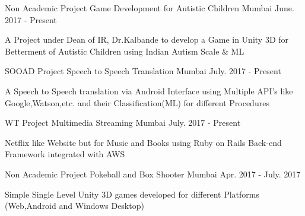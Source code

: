 

\begin{cventries}

  \cventry
    {Non Academic Project} %
    {Game Development for Autistic Children} %
    {Mumbai} %
    {June. 2017 - Present} %
    {
      \begin{cvitems} %
        \item {A Project under Dean of IR, Dr.Kalbande to develop a Game in Unity 3D for Betterment of Autistic Children using Indian Autism Scale \& ML}
      \end{cvitems}
    }

  \cventry
    {SOOAD Project} %
    {Speech to Speech Translation} %
    {Mumbai} %
    {July. 2017 - Present} %
    {
      \begin{cvitems} %
        \item {A Speech to Speech translation via Android Interface using Multiple API's like Google,Watson,etc. and their Classification(ML) for different    Procedures}
      \end{cvitems}
    }
  \cventry
    {WT Project} %
    {Multimedia Streaming} %
    {Mumbai} %
    {July. 2017 - Present} %
    {
      \begin{cvitems} %
        \item {Netflix like Website but for Music and Books using Ruby on Rails Back-end Framework integrated with AWS}
      \end{cvitems}
    }

  \cventry
    {Non Academic Project} %
    {Pokeball and Box Shooter} %
    {Mumbai} %
    {Apr. 2017 - July. 2017} %
    {
      \begin{cvitems} %
        \item {Simple Single Level Unity 3D games developed for different Platforms (Web,Android and Windows Desktop)}
      \end{cvitems}
    }


\end{cventries}
